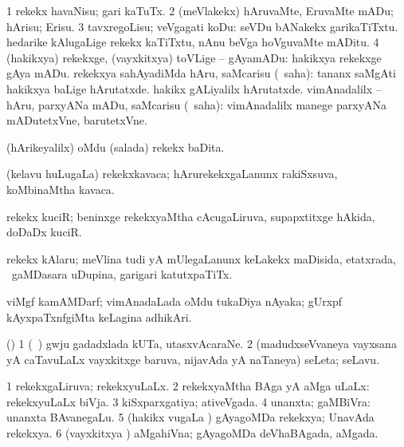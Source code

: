\bentry
{} 
\gl{\sakirx}
\bmng
\bnum
\num{1} rekekx havaNisu; gari kaTuTx. 
\num{2} (meVlakekx) hAruvaMte, EruvaMte mADu; hArisu; Erisu. 
\num{3} tavxregoLisu; veVgagati koDu:  seVDu bANakekx garikaTiTxtu.  hedarike kAlugaLige rekekx kaTiTxtu, nAnu beVga hoVguvaMte mADitu. 
\num{4} (hakikxya) rekekxge, (vayxkitxya) toVLige -- gAyamADu:  hakikxya rekekxge gAya mADu. 
\banum
{} rekekxya sahAyadiMda hAru, saMcarisu (\akirx\ saha):  tananx saMgAti hakikxya baLige hArutatxde.  hakikx gALiyalilx hArutatxde. 
 vimAnadalilx -- hAru, parxyANa mADu, saMcarisu (\akirx\ saha):  vimAnadalilx manege parxyANa mADutetxVne, barutetxVne. 
\eanum
\numie
\enum
\emng
\eentry

\bentry
{}
\gl{\nA}
\bmng
(hArikeyalilx) oMdu (salada) rekekx baDita. 
\emng
\eentry

\bentry
{}
\gl{\nA}
\bmng
(kelavu huLugaLa) rekekxkavaca; hArurekekxgaLanunx rakiSxsuva, koMbinaMtha kavaca. 
\emng
\eentry

\bentry
{}
\gl{\nA}
\bmng
rekekx kuciR; beninxge rekekxyaMtha cAcugaLiruva, supapxtitxge hAkida, doDaDx kuciR. 
\emng
\eentry

\bentry
{}
\gl{\nA}
\bmng
rekekx kAlaru; meVlina tudi yA mUlegaLanunx keLakekx maDisida, etatxrada, \kanmu\ gaMDasara uDupina, garigari katutxpaTiTx. 
\emng
\eentry

\bentry
{}
\gl{\nA}
\bmng
viMgf kamAMDarf; vimAnadaLada oMdu tukaDiya nAyaka; gUrxpf kAyxpaTxnfgiMta keLagina  adhikAri. 
\emng
\eentry

\bentry
{}
\gl{\nA}
\bmng
(\ashi) 
\bnum
\num{1} (\kanmu\ \ame) gwju gadadxlada kUTa, utasxvAcaraNe. 
\num{2} (madudxseVvaneya vayxsana yA caTavuLaLx vayxkitxge baruva, nijavAda yA naTaneya) seLeta; seLavu. 
\enum
\emng
\eentry

\bentry
{}
\gl{\gu}
\bmng
\bnum
\num{1} rekekxgaLiruva; rekekxyuLaLx. 
\num{2} rekekxyaMtha BAga yA aMga uLaLx:  rekekxyuLaLx biVja. 
\num{3} kiSxparxgatiya; ativeVgada. 
\num{4} unanxta; gaMBiVra:  unanxta BAvanegaLu. 
\num{5} (hakikx \mo vugaLa \vi) gAyagoMDa rekekxya; UnavAda rekekxya. 
\num{6} (vayxkitxya \vi) aMgahiVna; gAyagoMDa deVhaBAgada, aMgada. 
\enum
\emng
\eentry

